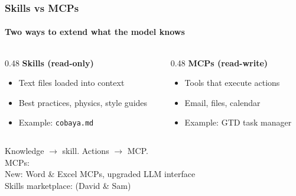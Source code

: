 \documentclass[aspectratio=169]{beamer}
\begin{document}
\begin{frame}
    \frametitle{Skills vs MCPs}
    \framesubtitle{Two ways to extend what the model knows}
    \begin{columns}[t]
        \begin{column}{0.48\textwidth}
            \textbf{Skills (read-only)}
            \begin{itemize}
                \item \small{Text files loaded into context}
                \item \small{Best practices, physics, style guides}
                \item \small{Example: \texttt{cobaya.md}}
            \end{itemize}
        \end{column}
        \begin{column}{0.48\textwidth}
            \textbf{MCPs (read-write)}
            \begin{itemize}
                \item \small{Tools that execute actions}
                \item \small{Email, files, calendar}
                \item \small{Example: GTD task manager}
            \end{itemize}
        \end{column}
    \end{columns}
    \vspace{1em}
    \centering
    Knowledge $\to$ skill. Actions $\to$ MCP.\\
    \vspace{0.5em}
    \small{MCPs: }\\
    \small{New: Word \& Excel MCPs, upgraded LLM interface}\\
    \small{Skills marketplace:  (David \& Sam)}
\end{frame}
\end{document}
